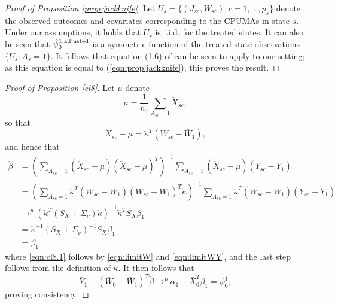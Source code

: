 \begin{proof}[Proof of Proposition \ref{prop:jackknife}]
Let $U_s = \{(J_{sc}, W_{sc}): c = 1,\ldots,p_s\}$ denote the observed outcomes and covariates corresponding to the CPUMAs in state $s$. Under our assumptions, it holds that $U_s$ is i.i.d. for the treated states. It can also be seen that $\hat{\psi}_0^{1,\textup{adjusted}}$ is a symmetric function of the treated state observations $\{U_s: A_s=1\}$. It follows that equation (1.6) of  \cite{efron1981jackknife} can be seen to apply to our setting; as this equation is equal to (\ref{eqn:prop.jackknife}), this proves the result.
\end{proof}


\begin{proof}[Proof of Proposition \ref{cl8}]
Let $\mu$ denote 
\[ \mu = \frac{1}{n_1} \sum_{A_{sc} = 1} \check{X}_{sc},\]
so that
\[ \check{X}_{sc} - \mu = \check{\kappa}^T(W_{sc} - \bar{W}_1),\]
and hence that 
\begin{align}
 \nonumber \check{\beta} &=  \left(\sum_{A_{sc}=1} (\check{X}_{sc} - \mu)(\check{X}_{sc} - \mu)^T\right)^{-1} \sum_{A_{sc}=1} (\check{X}_{sc} - \mu)(Y_{sc} - \bar{Y}_1) \\
 \nonumber & = \left(\sum_{A_{sc}=1} \check{\kappa}^T (W_{sc} - \bar{W}_1)(W_{sc} - \bar{W}_1)^T \check{\kappa}\right)^{-1} \sum_{A_{sc}=1} \check{\kappa}^T(W_{sc} - \bar{W}_1)(Y_{sc} - \bar{Y}_1) \\
 & \to^p (\check{\kappa}^T (S_X + \Sigma_\nu) \check{\kappa})^{-1} \check{\kappa}^T S_X \beta_1  \label{eqn:cl8.1}\\
 \nonumber 
 & = \check{\kappa}^{-1} (S_X + \Sigma_{\nu})^{-1} S_X \beta_1 \\
 \nonumber 
 & = \beta_1
 \end{align}
 where \eqref{eqn:cl8.1} follows by \eqref{eqn:limitW} and \eqref{eqn:limitWY}, and the last step follows from the definition of $\check{\kappa}$. It then follows that 
 \[ \bar{Y}_1 - (\bar{W}_0 - \bar{W}_1)^T \check{\beta} \to^p \alpha_1 + \bar{X}_0^T \beta_1 = \psi_0^1,\]
 proving consistency.
\end{proof}

